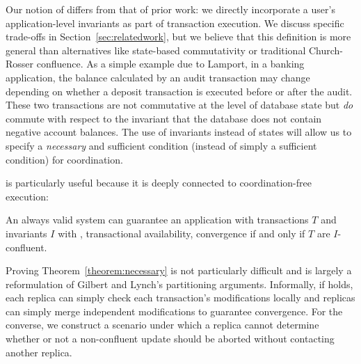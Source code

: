  Our notion of \iconfluence
differs from that of prior work: we directly incorporate a user's
application-level invariants as part of transaction execution. We
discuss specific trade-offs in Section~\ref{sec:relatedwork}, but we
believe that this definition is more general than alternatives like
state-based commutativity or traditional Church-Rosser confluence. As
a simple example due to Lamport, in a banking application, the balance
calculated by an audit transaction may change depending on whether a
deposit transaction is executed before or after the audit. These two
transactions are not commutative at the level of database state but
\textit{do} commute with respect to the invariant that the database
does not contain negative account balances. The use of invariants
instead of states will allow us to specify a \textit{necessary} and
sufficient condition (instead of simply a sufficient condition) for
coordination.

\iconfluence is particularly useful because it is deeply connected to
coordination-free execution:

\begin{theorem}
\label{theorem:necessary}
An always valid system can guarantee an application with transactions
$T$ and invariants $I$ with \cfreedom, transactional availability,
convergence if and only if $T$ are $I$-confluent.
\end{theorem}

Proving Theorem~\ref{theorem:necessary} is not particularly difficult
and is largely a reformulation of Gilbert and Lynch's partitioning
arguments. Informally, if \iconfluence holds, each replica can simply
check each transaction's modifications locally and replicas can simply
merge independent modifications to guarantee convergence. For the
converse, we construct a scenario under which a replica cannot
determine whether or not a non-confluent update should be aborted
without contacting another replica.

